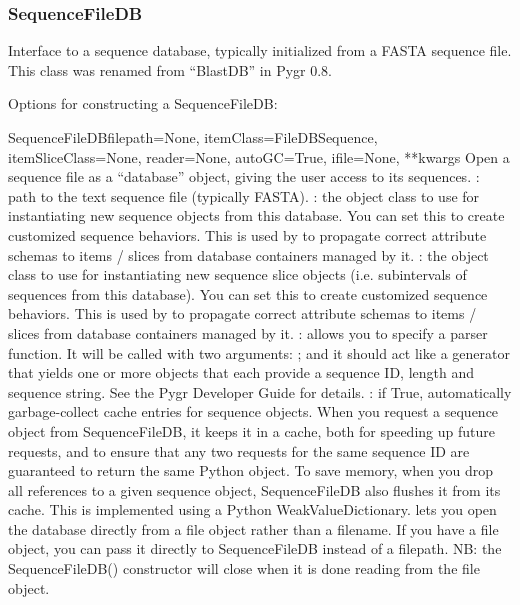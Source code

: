 \documentclass{howto}
\begin{document}
\subsubsection{SequenceFileDB}
Interface to a sequence database, typically initialized from a FASTA sequence file. 
This class was renamed from ``BlastDB'' in Pygr 0.8.

Options for constructing a SequenceFileDB:

\begin{funcdesc}{SequenceFileDB}{filepath=None, itemClass=FileDBSequence,
                 itemSliceClass=None, reader=None,
                 autoGC=True, ifile=None, **kwargs}
  Open a sequence file as a ``database'' object, giving the user access
  to its sequences.
  : path to the text sequence file (typically FASTA).
  : the object class to use for instantiating new sequence
  objects from this database.  You can set this to create customized
  sequence behaviors.  
  This is used by  to propagate correct attribute schemas to
  items / slices from database containers managed by it.
  : the object class to use for instantiating new
  sequence slice objects (i.e. subintervals of sequences from this database).
  You can set this to create customized sequence behaviors.
  This is used by  to propagate correct attribute schemas to
  items / slices from database containers managed by it.  
  : allows you to specify a parser function.
  It will be called with 
  two arguments: ; and it should
  act like a generator that yields one or more objects that
  each provide a sequence ID, length and sequence string.  See 
  the Pygr Developer Guide for details.
  : if True, automatically garbage-collect cache entries
  for sequence objects.  When you request a sequence object from
  SequenceFileDB, it keeps it in a cache, both for speeding up future
  requests, and to ensure that any two requests for the same sequence ID
  are guaranteed to return the same Python object.  To save memory,
  when you drop all references to a given sequence object, SequenceFileDB
  also flushes it from its cache.  This is implemented using a Python
  WeakValueDictionary.
   lets you open the database directly from a file object rather
  than a filename.  If you have a file object, you can pass it directly to
  SequenceFileDB instead of a filepath.  NB: the SequenceFileDB()
  constructor will close  when it is done reading from
  the file object.
\end{funcdesc}
\end{document}
